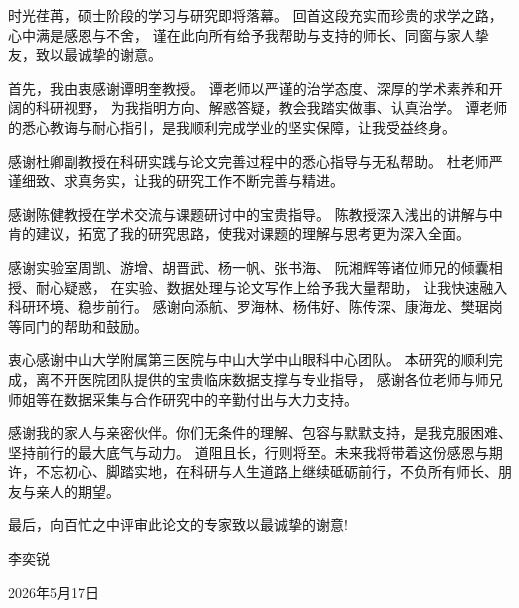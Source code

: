 
时光荏苒，硕士阶段的学习与研究即将落幕。
回首这段充实而珍贵的求学之路，心中满是感恩与不舍，
谨在此向所有给予我帮助与支持的师长、同窗与家人挚友，致以最诚挚的谢意。

首先，我由衷感谢谭明奎教授。
谭老师以严谨的治学态度、深厚的学术素养和开阔的科研视野，
为我指明方向、解惑答疑，教会我踏实做事、认真治学。
谭老师的悉心教诲与耐心指引，是我顺利完成学业的坚实保障，让我受益终身。

感谢杜卿副教授在科研实践与论文完善过程中的悉心指导与无私帮助。
杜老师严谨细致、求真务实，让我的研究工作不断完善与精进。

感谢陈健教授在学术交流与课题研讨中的宝贵指导。
陈教授深入浅出的讲解与中肯的建议，拓宽了我的研究思路，使我对课题的理解与思考更为深入全面。

感谢实验室周凯、游增、胡晋武、杨一帆、张书海、
阮湘辉等诸位师兄的倾囊相授、耐心疑惑，
在实验、数据处理与论文写作上给予我大量帮助，
让我快速融入科研环境、稳步前行。
感谢向添航、罗海林、杨伟好、陈传深、康海龙、樊琚岗等同门的帮助和鼓励。

衷心感谢中山大学附属第三医院与中山大学中山眼科中心团队。
本研究的顺利完成，离不开医院团队提供的宝贵临床数据支撑与专业指导，
感谢各位老师与师兄师姐等在数据采集与合作研究中的辛勤付出与大力支持。

感谢我的家人与亲密伙伴。你们无条件的理解、包容与默默支持，是我克服困难、坚持前行的最大底气与动力。
道阻且长，行则将至。未来我将带着这份感恩与期许，不忘初心、脚踏实地，在科研与人生道路上继续砥砺前行，不负所有师长、朋友与亲人的期望。

最后，向百忙之中评审此论文的专家致以最诚挚的谢意!



\hfill 李奕锐 \par

\hfill 2026年5月17日
